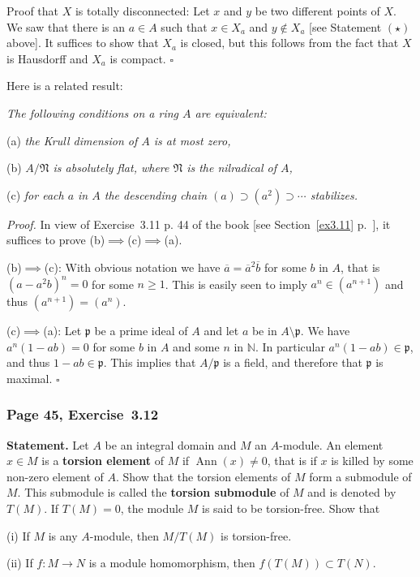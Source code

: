 \documentclass[12pt,letterpaper]{article}%
\newcommand{\oo}{\operatorname}\newcommand{\ooo}{\operatorname*}
\newcommand{\mf}{\mathfrak}
\newcommand{\ppp}{\mf p}
\newcommand{\NNN}{\mf N}\newcommand{\RRR}{\mf R}
\newcommand{\Ann}{\oo{Ann}}
\newcommand{\nn}{\noindent}
\begin{document}
\nn Proof that $X$ is totally disconnected: Let $x$ and $y$ be two different points of $X$. We saw that there is an $a\in A$ such that $x\in X_a$ and $y\notin X_a$ [see Statement $(\star)$ above]. It suffices to show that $X_a$ is closed, but this follows from the fact that $X$ is Hausdorff and $X_a$ is compact.  
$\square$

Here is a related result: 

\nn\emph{The following conditions on a ring $A$ are equivalent:}

\nn(a) \emph{the Krull dimension of $A$ is at most zero,}

\nn(b) \emph{$A/\NNN$ is absolutely flat, where $\NNN$ is the nilradical of $A$,}

\nn(c) \emph{for each $a$ in $A$ the descending chain $(a)\supset(a^2)\supset\cdots$ stabilizes.}

\nn\emph{Proof.} In view of Exercise~3.11 p. 44 of the book [see Section~\ref{ex3.11} p.~\pageref{ex3.11}], it suffices to prove (b)$\implies$(c)$\implies$(a). 

\nn(b)$\implies$(c): With obvious notation we have $\overline a=\overline a^2\overline b$ for some $b$ in $A$, that is $(a-a^2b)^n=0$ for some $n\ge1$. This is easily seen to imply $a^n\in(a^{n+1})$ and thus $(a^{n+1})=(a^n)$. 

\nn(c)$\implies$(a): Let $\ppp$ be a prime ideal of $A$ and let $a$ be in $A\setminus\ppp$. We have $a^n(1-ab)=0$ for some $b$ in $A$ and some $n$ in $\mathbb N$. In particular $a^n(1-ab)\in\ppp$, and thus $1-ab\in\ppp$. This implies that $A/\ppp$ is a field, and therefore that $\ppp$ is maximal. $\square$

\subsubsection{Page 45, Exercise~3.12}%

\textbf{Statement.} Let $A$ be an integral domain and $M$ an $A$-module. An element $x\in M$ is a \textbf{torsion element} of $M$ if $\Ann(x)\ne0$, that is if $x$ is killed by some non-zero element of $A$. Show that the torsion elements of $M$ form a submodule of $M$. This submodule is called the \textbf{torsion submodule} of $M$ and is denoted by $T(M)$. If $T(M)=0$, the module $M$ is said to be torsion-free. Show that

\nn(i) If $M$ is any $A$-module, then $M/T(M)$ is torsion-free.

\nn(ii) If $f: M\to N$ is a module homomorphism, then $f(T(M))\subset T(N)$.
\end{document}
